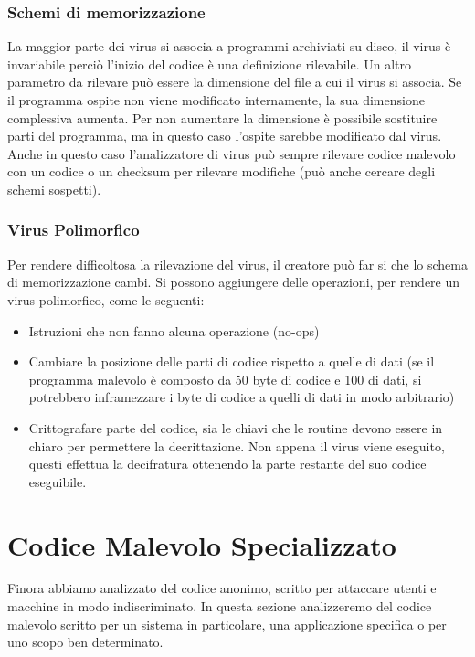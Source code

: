 \subsubsection{Schemi di memorizzazione}
La maggior parte dei virus si associa a programmi archiviati su disco, il virus è invariabile perciò l'inizio del codice è una definizione rilevabile. Un altro parametro da rilevare può essere la dimensione del file a cui il virus si associa. Se il programma ospite  non viene modificato internamente, la sua dimensione complessiva aumenta.
Per non aumentare la dimensione è possibile  sostituire parti del programma, ma in questo caso l'ospite sarebbe modificato dal virus.
\newline
Anche in questo caso l'analizzatore di virus può sempre rilevare codice malevolo con un codice o un checksum per rilevare modifiche (può anche cercare degli schemi sospetti).
\subsubsection{Virus Polimorfico}
Per rendere difficoltosa la rilevazione del virus, il creatore può far si che lo schema di memorizzazione cambi. Si possono aggiungere delle operazioni, per rendere un virus polimorfico, come le seguenti:

\begin{itemize}

	\item Istruzioni che non fanno alcuna operazione (no-ops)
	\item Cambiare la posizione delle parti di codice rispetto a quelle di dati (se il programma malevolo è composto da 50 byte di codice e 100 di dati, si potrebbero inframezzare i byte di codice a quelli di dati in modo arbitrario)
	\item Crittografare parte del codice, sia le chiavi che le routine devono essere in chiaro per permettere la decrittazione. Non appena il virus viene eseguito, questi effettua la decifratura ottenendo la parte restante del suo codice eseguibile.
	
\end{itemize}

\section{Codice Malevolo Specializzato}
Finora abbiamo analizzato del codice anonimo, scritto per attaccare utenti e macchine in modo indiscriminato.
In questa sezione analizzeremo del codice malevolo scritto per un sistema in particolare, una applicazione specifica o per uno scopo ben determinato.
